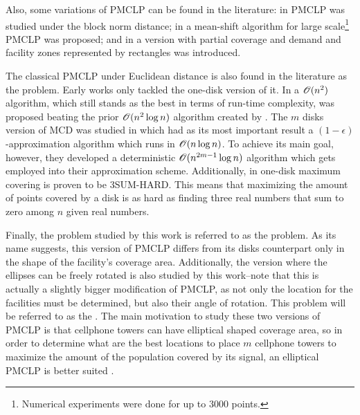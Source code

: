 Also, some variations of PMCLP can be found in the literature: in  PMCLP was studied under the block norm distance; in  a mean-shift algorithm for large scale\footnote{Numerical experiments were done for up to $3000$ points.} PMCLP was proposed; and in  a version with partial coverage and demand and facility zones represented by rectangles was introduced.

The classical PMCLP under Euclidean distance is also found in the literature as the  problem. 
Early works only tackled the one-disk version of it. In  a $\mathscr{O}(n^2)$ algorithm, which still stands as the best in terms of run-time complexity, was proposed beating the prior $\mathscr{O}(n^2\log{n})$ algorithm created by .
The $m$ disks version of MCD was studied in  which had as its most important result a $(1-\epsilon)$-approximation algorithm which runs in $\mathscr{O}(n\log{n})$. To achieve its main goal, however, they developed a deterministic $\mathscr{O}(n^{2m-1}\log{n})$ algorithm which gets employed into their approximation scheme.
Additionally, in  one-disk maximum covering is proven to be 3SUM-HARD. This means that maximizing the amount of points covered by a disk is as hard as finding three real numbers that sum to zero among $n$ given real numbers.

Finally, the problem studied by this work is referred to as the  problem. As its name suggests, this version of PMCLP differs from its disks counterpart only in the shape of the facility's coverage area. Additionally, the version where the ellipses can be freely rotated is also studied by this work--note that this is actually a slightly bigger modification of PMCLP, as not only the location for the facilities must be determined, but also their angle of rotation. This problem will be referred to as the .
The main motivation to study these two versions of PMCLP is that cellphone towers can have elliptical shaped coverage area, so in order to determine what are the best locations to place $m$ cellphone towers to maximize the amount of the population covered by its signal, an elliptical PMCLP is better suited \cite{canbolat}.

